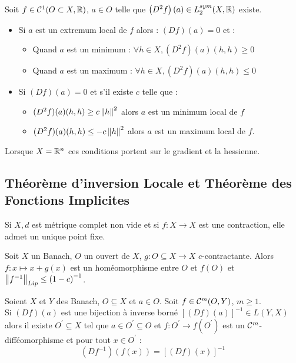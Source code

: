 \documentclass{cours}
\begin{document}
\begin{corollary}
    Soit $f \in \mathcal{C}^{1}(O \subset X, \mathbb{R})$, $a \in O$ telle que $\left(D^{2}f\right)(a) \in L_{2}^{sym}(X, \mathbb{R})$ existe.
    \begin{itemize}
        \item Si $a$ est un extremum local de $f$ alors : $\left(Df\right)(a) = 0$ et : 
        \begin{itemize}
            \item Quand $a$ est un minimum : $\forall h \in X, \left(D^{2}f\right)(a)(h,h) \geq 0$
            \item Quand $a$ est un maximum : $\forall h \in X, \left(D^{2}f\right)(a)(h,h) \leq 0$
        \end{itemize}
        \item Si $\left(Df\right)(a) = 0$ et s'il existe $c$ telle que : 
        \begin{itemize}
            \item $(D^{2}f)(a)(h, h) \geq c \left\lVert h \right\rVert^{2}$ alors $a$ est un minimum local de $f$
            \item $(D^{2}f)(a)(h, h) \leq -c \left\lVert h \right\rVert^{2}$ alors $a$ est un maximum local de $f$.
        \end{itemize}
    \end{itemize}
    Lorsque $X = \mathbb{R}^{n}$ ces conditions portent sur le gradient et la hessienne. 
\end{corollary}

\subsection{Théorème d'inversion Locale et Théorème des Fonctions Implicites}
\begin{lemma}
    Si $X, d$ est métrique complet non vide et si $f : X \rightarrow X$ est une contraction, elle admet un unique point fixe.
\end{lemma}

\begin{lemma}
    Soit $X$ un Banach, $O$ un ouvert de $X$, $g : O \subseteq X \rightarrow X$ $c$-contractante. Alors $f : x \mapsto x + g(x)$ est un homéomorphisme entre $O$ et $f(O)$ et $\left\lVert f^{-1} \right\rVert_{Lip} \leq \left(1 - c\right)^{-1}$.
\end{lemma}

\begin{theorem}
    Soient $X$ et $Y$ des Banach, $O \subseteq X$ et $a \in O$. Soit $f \in \mathcal{C}^{m}(O, Y)$, $m \geq 1$.\\
    Si $(Df)(a)$ est une bijection à inverse borné $\left[(Df)(a)\right]^{-1} \in L(Y, X)$ alors il existe $O^{'} \subseteq X$ tel que $a \in O^{'} \subseteq O$ et $f : O^{'} \rightarrow f(O^{'})$ est un $\mathcal{C}^{m}$-difféomorphisme et pour tout $x \in O^{'}$ : 
    \[
        \left(Df^{-1}\right)(f(x)) = \left[(Df)(x)\right]^{-1}
    \]
\end{theorem}
\end{document}

